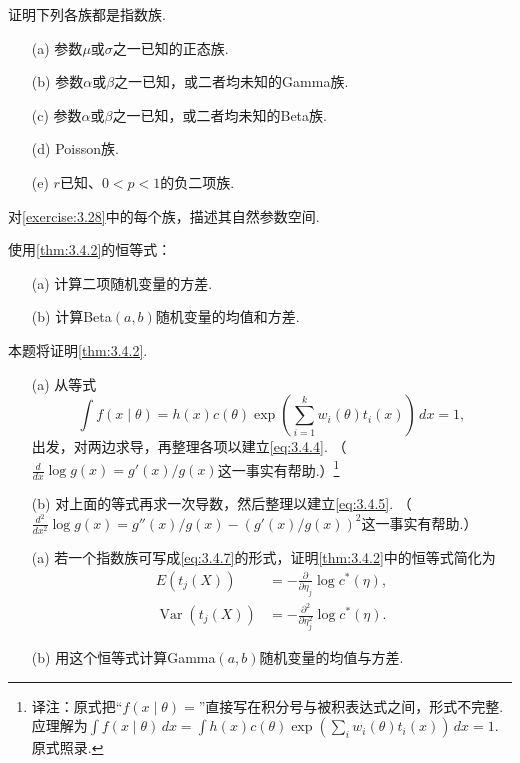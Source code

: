 \begin{exercise}\label{exercise:3.28}
证明下列各族都是指数族.
\begin{enumerate}
\item[(a)] 参数$\mu$或$\sigma$之一已知的正态族.
\item[(b)] 参数$\alpha$或$\beta$之一已知，或二者均未知的Gamma族.
\item[(c)] 参数$\alpha$或$\beta$之一已知，或二者均未知的Beta族.
\item[(d)] Poisson族.
\item[(e)] $r$已知、$0<p<1$的负二项族.
\end{enumerate}
\end{exercise}
\begin{exercise}\label{exercise:3.29}
对\autoref{exercise:3.28}中的每个族，描述其自然参数空间.
\end{exercise}
\begin{exercise}\label{exercise:3.30}
使用\autoref{thm:3.4.2}的恒等式：
\begin{enumerate}
\item[(a)] 计算二项随机变量的方差.
\item[(b)] 计算Beta$(a,b)$随机变量的均值和方差.
\end{enumerate}
\end{exercise}
\begin{exercise}\label{exercise:3.31}
本题将证明\autoref{thm:3.4.2}.
\begin{enumerate}
\item[(a)] 从等式
$$\int f(x\mid\theta)=h(x)c(\theta)\exp\left(\sum_{i=1}^k w_i(\theta)t_i(x)\right)\,dx=1,$$
出发，对两边求导，再整理各项以建立\eqref{eq:3.4.4}. （$\frac d{dx}\log g(x)=g'(x)/g(x)$这一事实有帮助.）\footnote{译注：原式把“$f(x\mid\theta)=$”直接写在积分号与被积表达式之间，形式不完整. 应理解为$\int f(x\mid\theta)\,dx=\int h(x)c(\theta)\exp(\sum_iw_i(\theta)t_i(x))\,dx=1$. 原式照录.}
\item[(b)] 对上面的等式再求一次导数，然后整理以建立\eqref{eq:3.4.5}. （$\frac{d^2}{dx^2}\log g(x)=g''(x)/g(x)-(g'(x)/g(x))^2$这一事实有帮助.）
\end{enumerate}
\end{exercise}
\begin{exercise}\label{exercise:3.32}\leavevmode
\begin{enumerate}
\item[(a)] 若一个指数族可写成\eqref{eq:3.4.7}的形式，证明\autoref{thm:3.4.2}中的恒等式简化为
\begin{align*}
E(t_j(X))&=-\frac\partial{\partial\eta_j}\log c^*(\eta),\\
\operatorname{Var}(t_j(X))&=-\frac{\partial^2}{\partial\eta_j^2}\log c^*(\eta).
\end{align*}
\item[(b)] 用这个恒等式计算Gamma$(a,b)$随机变量的均值与方差.
\end{enumerate}
\end{exercise}
